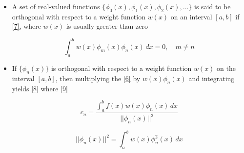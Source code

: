 \documentclass[12pt]{article}
\begin{document}
\begin{itemize}
  \item A set of real-valued functions $\{\phi_0(x),\phi_1(x),\phi_2(x),\dots\}$ is said to be orthogonal with respect to a weight function $w(x)$ on an interval $[a,b]$ if \eqref{7}, where $w(x)$ is usually greater than zero

    \begin{equation}
      \int_a^bw(x)\phi_m(x)\phi_n(x)\,dx=0,\,\,\,\,\,\,m\neq n 
      \label{7}
    \end{equation}

  \item If $\{\phi_n(x)\}$ is orthogonal with respect to a weight function $w(x)$ on the interval $[a,b]$, then multiplying the \eqref{6} by $w(x)\phi_n(x)$ and integrating yields \eqref{8} where \eqref{9}

    \begin{equation}
      c_n=\frac{\int_a^b f(x)w(x)\phi_n(x)\,dx}{||\phi_n(x)||^2}
      \label{8}
    \end{equation}

    \begin{equation}
      ||\phi_n(x)||^2=\int_a^bw(x)\phi_n^2(x)\,dx
      \label{9}
    \end{equation}


\end{itemize}
\end{document}

